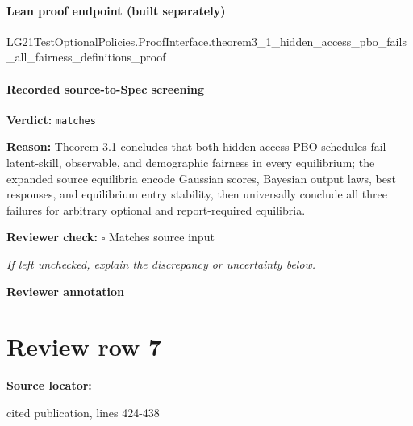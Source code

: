 \documentclass[10pt]{article}
\newcommand{\reviewerbox}{%
  \par\noindent\fbox{\parbox{0.96\linewidth}{\rule{0pt}{0.38in}}}\par
}
\newcommand{\reviewmatch}[1]{%
  \par\noindent\textbf{Reviewer check:} $\square$\; #1\par
  \noindent\emph{If left unchecked, explain the discrepancy or uncertainty below.}\par
}
\begin{document}
\paragraph{Lean proof endpoint (built separately)}\begin{ReviewVerbatim}
LG21TestOptionalPolicies.ProofInterface.theorem3_1_hidden_access_pbo_fails_all_fairness_definitions_proof
\end{ReviewVerbatim}

\paragraph{Recorded source-to-Spec screening}
\textbf{Verdict:} \texttt{matches}
\\
{\raggedright
\textbf{Reason:} Theorem 3.\allowbreak{}1 concludes that both hidden-\allowbreak{}access PBO schedules fail latent-\allowbreak{}skill, observable, and demographic fairness in every equilibrium;\allowbreak{} the expanded source equilibria encode Gaussian scores, Bayesian output laws, best responses, and equilibrium entry stability, then universally conclude all three failures for arbitrary optional and report-\allowbreak{}required equilibria.\allowbreak{}
\par}
\reviewmatch{Matches source input}
\noindent\textbf{Reviewer annotation}\par
\reviewerbox
\clearpage
\hypertarget{source-claim-6c73f99151b1b2c7}{}
\section*{Review row 7}
\textbf{Source locator:} {\footnotesize\raggedright cited publication, lines 424-\allowbreak{}438\par}
\end{document}

